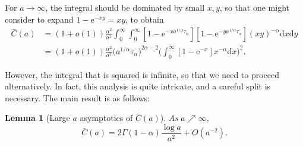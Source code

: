\documentclass[ twocolumn,
 amsmath,amssymb,
 aps, pre, amsthm, amsfonts,
]{revtex4-2}
\newtheorem{lemma}{Lemma}
\newcommand{\e}{\mathrm{e}}
\newcommand{\nn}{\nonumber}
\begin{document}
For $a\rightarrow \infty$, the integral should be dominated by small $x,y$, so that one might consider to expand $1-\e^{-xy}=xy$, to obtain
\begin{align}
    \bar{C}(a)&=(1+o(1))
	\frac{\alpha^2}{a^2} \int_{0}^{\infty} \int_{0}^{\infty}[1-\e^{-xa^{1/\alpha} {\tau_\alpha}}][1-\e^{-ya^{1/\alpha} {\tau_\alpha}}](xy)^{-\alpha}
	{\mathrm d}x {\mathrm d}y\\
	&=(1+o(1))
	\frac{\alpha^2}{a^2} \big(a^{1/\alpha} {\tau_\alpha}\big)^{2\alpha-2}\Big(\int_{0}^{\infty}[1-\e^{-x}]x^{-\alpha}
	{\mathrm d}x\Big)^2.\nn
\end{align}

However, the integral that is squared is infinite, so that we need to proceed alternatively. In fact, this analysis is quite intricate, and a careful split is necessary. The main result is as follows:
\begin{lemma}[Large $a$ asymptotics of $\bar{C}(a)$]
\label{lem-annealed-large-a}
As $a\nearrow \infty$,
	\begin{equation}
	    \bar{C}(a)=2 \Gamma(1-\alpha)\frac{\log{a}}{a^2} +O(a^{-2}).
	\end{equation}
\end{lemma} 
\end{document}
